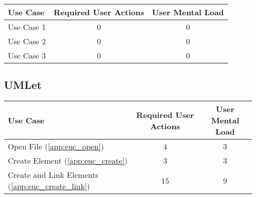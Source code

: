 


\begin{tabularx}{\textwidth}{Xcc}
\textbf{Use Case} & \textbf{Required User Actions} & \textbf{User Mental Load}\\
\hline
Use Case 1                          & {\color{red}0} & {\color{red}0} \\
Use Case 2                          & {\color{red}0} & {\color{red}0} \\
Use Case 3                          & {\color{red}0} & {\color{red}0}
\end{tabularx}

\subsection*{UMLet}




\begin{tabularx}{\textwidth}{Xcc}
\textbf{Use Case} & \textbf{Required User Actions} & \textbf{User Mental Load}\\
\hline
Open File (\ref{app:euc_open})                       & 4  & 3 \\
Create Element (\ref{app:euc_create})                & 3  & 3 \\
Create and Link Elements (\ref{app:euc_create_link}) & 15 & 9
\end{tabularx}


